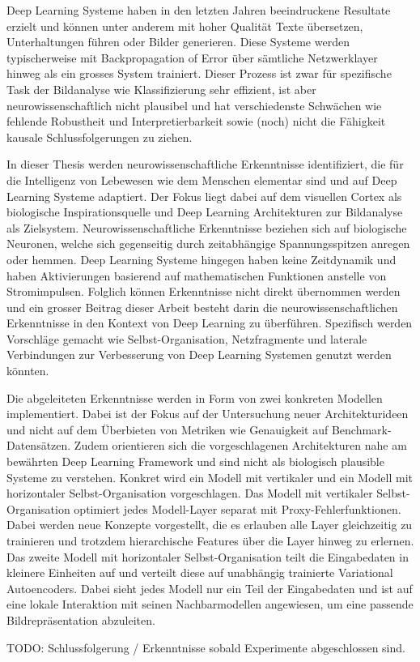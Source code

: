 Deep Learning Systeme haben in den letzten Jahren beeindruckene Resultate erzielt und können unter anderem mit hoher Qualität Texte übersetzen, Unterhaltungen führen oder Bilder generieren. Diese Systeme werden typischerweise mit Backpropagation of Error über sämtliche Netzwerklayer hinweg als ein grosses System trainiert. Dieser Prozess ist zwar für spezifische Task der Bildanalyse wie Klassifizierung sehr effizient, ist aber neurowissenschaftlich nicht plausibel und hat verschiedenste Schwächen wie fehlende Robustheit und Interpretierbarkeit sowie (noch) nicht die Fähigkeit kausale Schlussfolgerungen zu ziehen.

In dieser Thesis werden neurowissenschaftliche Erkenntnisse identifiziert, die für die Intelligenz von Lebewesen wie dem Menschen elementar sind und auf Deep Learning Systeme adaptiert. Der Fokus liegt dabei auf dem visuellen Cortex als biologische Inspirationsquelle und Deep Learning Architekturen zur Bildanalyse als Zielsystem. Neurowissenschaftliche Erkenntnisse beziehen sich auf biologische Neuronen, welche sich gegenseitig durch zeitabhängige Spannungsspitzen anregen oder hemmen. Deep Learning Systeme hingegen haben keine Zeitdynamik und haben Aktivierungen basierend auf mathematischen Funktionen anstelle von Stromimpulsen. Folglich können Erkenntnisse nicht direkt übernommen werden und ein grosser Beitrag dieser Arbeit besteht darin die neurowissenschaftlichen Erkenntnisse in den Kontext von Deep Learning zu überführen. Spezifisch werden Vorschläge gemacht wie Selbst-Organisation, Netzfragmente und laterale Verbindungen zur Verbesserung von Deep Learning Systemen genutzt werden könnten.

Die abgeleiteten Erkenntnisse werden in Form von zwei konkreten Modellen implementiert. Dabei ist der Fokus auf der Untersuchung neuer Architekturideen und nicht auf dem Überbieten von Metriken wie Genauigkeit auf Benchmark-Datensätzen. Zudem orientieren sich die vorgeschlagenen Architekturen nahe am bewährten Deep Learning Framework und sind nicht als biologisch plausible Systeme zu verstehen. Konkret wird ein Modell mit vertikaler und ein Modell mit horizontaler Selbst-Organisation vorgeschlagen. Das Modell mit vertikaler Selbst-Organisation optimiert jedes Modell-Layer separat mit Proxy-Fehlerfunktionen. Dabei werden neue Konzepte vorgestellt, die es erlauben alle Layer gleichzeitig zu trainieren und trotzdem hierarchische Features über die Layer hinweg zu erlernen. Das zweite Modell mit horizontaler Selbst-Organisation teilt die Eingabedaten in kleinere Einheiten auf und verteilt diese auf unabhängig trainierte Variational Autoencoders. Dabei sieht jedes Modell nur ein Teil der Eingabedaten und ist auf eine lokale Interaktion mit seinen Nachbarmodellen angewiesen, um eine passende Bildrepräsentation abzuleiten.

TODO: Schlussfolgerung / Erkenntnisse sobald Experimente abgeschlossen sind.



